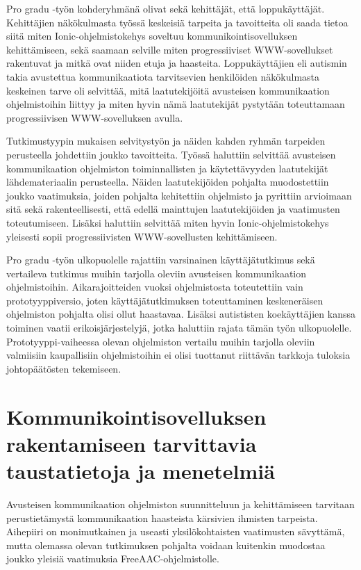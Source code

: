 \documentclass[utf8]{gradu3}
\begin{document}
Pro gradu -työn kohderyhmänä olivat sekä kehittäjät, että loppukäyttäjät. Kehittäjien näkökulmasta työssä keskeisiä tarpeita ja tavoitteita oli saada tietoa siitä miten Ionic-ohjelmistokehys soveltuu kommunikointisovelluksen kehittämiseen, sekä saamaan selville miten progressiiviset WWW-sovellukset rakentuvat ja mitkä ovat niiden etuja ja haasteita. Loppukäyttäjien eli autismin takia avustettua kommunikaatiota tarvitsevien henkilöiden näkökulmasta keskeinen tarve oli selvittää, mitä laatutekijöitä avusteisen kommunikaation ohjelmistoihin liittyy ja miten hyvin nämä laatutekijät pystytään toteuttamaan progressiivisen WWW-sovelluksen avulla.

Tutkimustyypin mukaisen selvitystyön ja näiden kahden ryhmän tarpeiden perusteella johdettiin joukko tavoitteita. Työssä haluttiin selvittää avusteisen kommunikaation ohjelmiston toiminnallisten ja käytettävyyden laatutekijät lähdemateriaalin perusteella. Näiden laatutekijöiden pohjalta muodostettiin joukko vaatimuksia, joiden pohjalta kehitettiin ohjelmisto ja pyrittiin arvioimaan sitä sekä rakenteellisesti, että edellä mainttujen laatutekijöiden ja vaatimusten toteutumiseen. Lisäksi haluttiin selvittää miten hyvin Ionic-ohjelmistokehys yleisesti sopii progressiivisten WWW-sovellusten kehittämiseen.

Pro gradu -työn ulkopuolelle rajattiin varsinainen käyttäjätutkimus sekä vertaileva tutkimus muihin tarjolla oleviin avusteisen kommunikaation ohjelmistoihin. Aikarajoitteiden vuoksi ohjelmistosta toteutettiin vain prototyyppiversio, joten käyttäjätutkimuksen toteuttaminen keskeneräisen ohjelmiston pohjalta olisi ollut haastavaa. Lisäksi autististen koekäyttäjien kanssa toiminen vaatii erikoisjärjestelyjä, jotka haluttiin rajata tämän työn ulkopuolelle. Prototyyppi-vaiheessa olevan ohjelmiston vertailu muihin tarjolla oleviin valmiisiin kaupallisiin ohjelmistoihin ei olisi tuottanut riittävän tarkkoja tuloksia johtopäätösten tekemiseen.

\chapter{Kommunikointisovelluksen rakentamiseen tarvittavia taustatietoja ja menetelmiä}

Avusteisen kommunikaation ohjelmiston suunnitteluun ja kehittämiseen tarvitaan perustietämystä kommunikaation haasteista kärsivien ihmisten tarpeista. Aihepiiri on monimutkainen ja useasti yksilökohtaisten vaatimusten sävyttämä, mutta olemassa olevan tutkimuksen pohjalta voidaan kuitenkin muodostaa joukko yleisiä vaatimuksia FreeAAC-ohjelmistolle.
\end{document}
